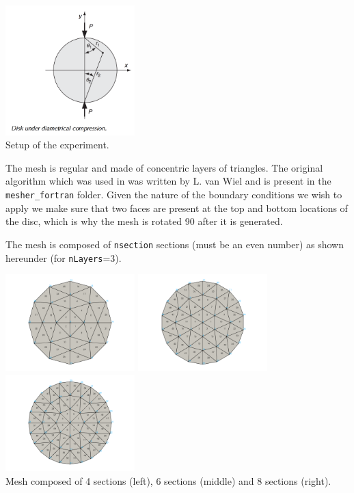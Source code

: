 \begin{center}
\includegraphics[width=5cm]{python_codes/fieldstone_58/experiment1/setup}\\
{\captionfont Setup of the experiment.}
\end{center}

The mesh is regular and made of concentric layers of triangles. The original algorithm
which was used in \elefant was written by L. van Wiel and is present in the {\tt mesher\_fortran} folder.  
Given the nature of the boundary 
conditions we wish to apply we make sure that two faces are present at the top and bottom 
locations of the disc, which is why the mesh is rotated 90\degree 
after it is generated.  

The mesh is composed of {\tt nsection} sections (must be an even number)
as shown hereunder (for {\tt nLayers}=3). 
\begin{center}
\includegraphics[width=5cm]{python_codes/fieldstone_58/images/mesh4}
\includegraphics[width=5cm]{python_codes/fieldstone_58/images/mesh6}
\includegraphics[width=5cm]{python_codes/fieldstone_58/images/mesh8}\\
{\captionfont Mesh composed of 4 sections (left), 6 sections (middle) and 8 sections (right).}
\end{center}

